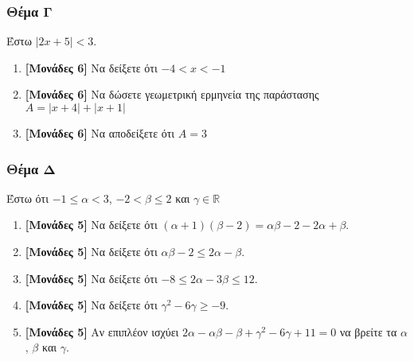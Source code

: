 \documentclass[12pt]{article}
\begin{document}
\section*{Θέμα Γ}
\noindent
Έστω $|2x+5|<3$.
\begin{enumerate}
  \item \textbf{[Μονάδες 6]} Να δείξετε ότι $-4<x<-1$
  \item \textbf{[Μονάδες 6]} Να δώσετε γεωμετρική ερμηνεία της παράστασης $Α=|x+4|+|x+1|$
  \item \textbf{[Μονάδες 6]} Να αποδείξετε ότι $Α=3$
\end{enumerate}

\section*{Θέμα Δ}
\noindent
Έστω ότι $-1\le α<3$, $-2<β\le 2$ και $γ\in\mathbb{R}$
\begin{enumerate}
  \item \textbf{[Μονάδες 5]} Να δείξετε ότι $(α+1)(β-2)=αβ-2-2α+β$.
  \item \textbf{[Μονάδες 5]} Να δείξετε ότι $αβ-2\le 2α-β$.
  \item \textbf{[Μονάδες 5]} Να δείξετε ότι $-8\le 2α-3β \le 12$.
  \item \textbf{[Μονάδες 5]} Να δείξετε ότι $γ^2-6γ \ge -9$.
  \item \textbf{[Μονάδες 5]} Αν επιπλέον ισχύει $2α-αβ-β+γ^2-6γ+11=0$ να βρείτε τα $α$, $β$ και $γ$.
\end{enumerate}


\part*{}
\end{document}
